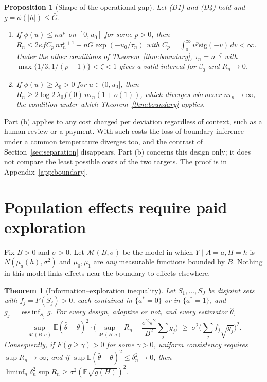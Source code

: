 \documentclass[12pt]{article}
\newtheorem{theorem}{Theorem}
\newtheorem{proposition}{Proposition}
\theoremstyle{definition}
\theoremstyle{remark}
\newcommand{\E}{\mathbb{E}}
\newcommand{\M}{\mathcal{M}}
\newcommand{\sgm}{\mathrm{sig}}
\DeclareMathOperator*{\essinf}{ess\,inf}
\begin{document}
\begin{proposition}[Shape of the operational gap]\label{prop:gapshape}
Let (D1) and (D4) hold and $g=\phi(|h|)\le\bar G$.
\begin{enumerate}[label=(\alph*),leftmargin=2em,itemsep=1pt]
\item If $\phi(u)\le\bar\kappa u^p$ on $[0,u_0]$ for some $p>0$, then
$R_n\le 2\bar\kappa\bar f C_p\,n\tau_n^{p+1}+n\bar G\exp(-u_0/\tau_n)$ with
$C_p=\int_0^\infty v^p\sgm(-v)\,dv<\infty$. Under the other conditions of
Theorem~\ref{thm:boundary}, $\tau_n=n^{-\zeta}$ with
$\max\{1/3,1/(p+1)\}<\zeta<1$ gives a valid interval for $\beta_0$ and $R_n\to0$.
\item If $\phi(u)\ge\lambda_0>0$ for $u\in(0,u_0]$, then
$R_n\ge2\log2\,\lambda_0f(0)\,n\tau_n(1+o(1))$, which diverges whenever
$n\tau_n\to\infty$, the condition under which Theorem~\ref{thm:boundary} applies.
\end{enumerate}
\end{proposition}

Part (b) applies to any cost charged per deviation regardless of context, such as a
human review or a payment. With such costs the loss of boundary inference under a
common temperature diverges too, and the contrast of Section~\ref{sec:separation}
disappears. Part (b) concerns this design only; it does not compare the least
possible costs of the two targets. The proof is in Appendix~\ref{app:boundary}.

\section{Population effects require paid exploration}\label{sec:population}

Fix $B>0$ and $\sigma>0$. Let $\M(B,\sigma)$ be the model in which
$Y\mid A=a,H=h$ is $N(\mu_a(h),\sigma^2)$ and $\mu_0,\mu_1$ are \emph{any}
measurable functions bounded by $B$. Nothing in this model links effects near the
boundary to effects elsewhere.

\begin{theorem}[Information--exploration inequality]\label{thm:info}
Let $S_1,\dots,S_J$ be disjoint sets with $f_j=F(S_j)>0$, each contained in
$\{a^*=0\}$ or in $\{a^*=1\}$, and $g_j=\essinf_{S_j}g$. For every design,
adaptive or not, and every estimator $\hat\theta$,
\begin{equation}\label{eq:info}
\sup_{\M(B,\sigma)}\E(\hat\theta-\theta)^2\cdot
\Big(\sup_{\M(B,\sigma)}R_n+\frac{\sigma^2\pi^2}{B^2}\sum_j g_j\Big)
\;\ge\;\sigma^2\Big(\sum_jf_j\sqrt{g_j}\Big)^2 .
\end{equation}
Consequently, if $F(g\ge\gamma)>0$ for some $\gamma>0$, uniform consistency
requires $\sup R_n\to\infty$; and if $\sup\E(\hat\theta-\theta)^2\le\delta_n^2\to0$,
then $\liminf_n\delta_n^2\sup R_n\ge\sigma^2(\E\sqrt{g(H)})^2$.
\end{theorem}
\end{document}
